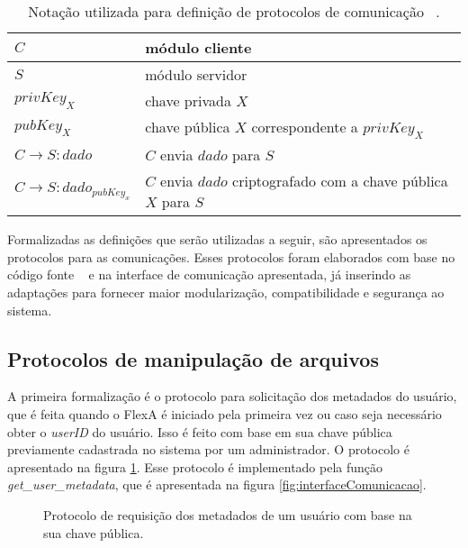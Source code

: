         \begin{table}[!ht]
        
        \centering
        \begin{tabular}{|l|l|}
        \hline
        
        $C$ & módulo cliente \\
        \hline
        $S$ & módulo servidor \\
        \hline
        $privKey_{X}$ & chave privada $X$ \\
        \hline
        $pubKey_{X}$ & chave pública $X$ correspondente a $privKey_{X}$\\
        \hline
        $C \rightarrow S : dado$ & $C$ envia $dado$ para $S$\\
        \hline
        $C \rightarrow S : {dado}_{pubKey_{x}}$ & $C$ envia $dado$ criptografado com a chave pública $X$ para $S$\\
        \hline

        \end{tabular}
        \caption{Notação utilizada para definição de protocolos de comunicação ~\cite{ross}.}
        \label{tab:notacao}
        \end{table}
        
        Formalizadas as definições que serão utilizadas a seguir, são apresentados os protocolos para as comunicações. Esses protocolos foram elaborados com base no código fonte ~\cite{mario} e na interface de comunicação apresentada, já inserindo as adaptações para fornecer maior modularização, compatibilidade e segurança ao sistema.
        
        \subsection{Protocolos de manipulação de arquivos}
        
        A primeira formalização é o protocolo para solicitação dos metadados do usuário, que é feita quando o FlexA é iniciado pela primeira vez ou caso seja necessário obter o \textit{userID} do usuário. Isso é feito com base em sua chave pública previamente cadastrada no sistema por um administrador. O protocolo é apresentado na figura \ref{fig:protMetadadosUsuario}. Esse protocolo é implementado pela função \textit{get\_user\_metadata}, que é apresentada na figura \ref{fig:interfaceComunicacao}.
        
        \begin{figure}[!ht]
        
        
        \caption{Protocolo de requisição dos metadados de um usuário com base na sua chave pública.}
        \label{fig:protMetadadosUsuario}
        \end{figure}
        
